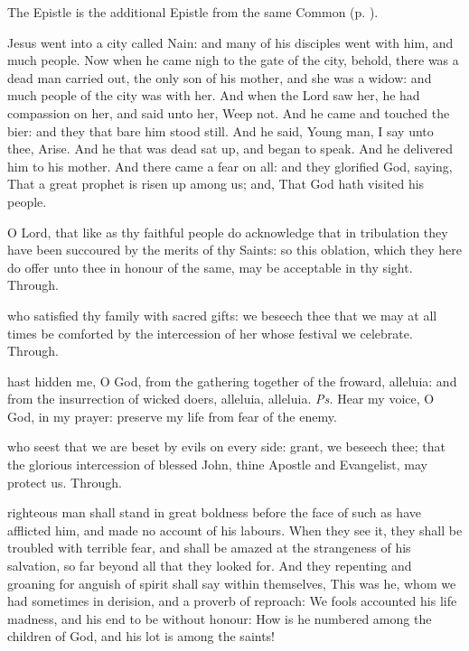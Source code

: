 \begin{rubric}
	The Epistle is the additional Epistle from the same Common (p. \pageref{1Timothy53}).
\end{rubric}

 Jesus went into a city called Nain: and many of his disciples went with him, and much people. Now when he came nigh to the gate of the city, behold, there was a dead man carried out, the only son of his mother, and she was a widow: and much people of the city was with her. And when the Lord saw her, he had compassion on her, and said unto her, Weep not. And he came and touched the bier: and they that bare him stood still. And he said, Young man, I say unto thee, Arise. And he that was dead sat up, and began to speak. And he delivered him to his mother. And there came a fear on all: and they glorified God, saying, That a great prophet is risen up among us; and, That God hath visited his people.

\secret
{} O Lord, that like as thy faithful people do acknowledge that in tribulation they have been succoured by the merits of thy Saints: so this oblation, which they here do offer unto thee in honour of the same, may be acceptable in thy sight. Through.

\postcommunion
{} who satisfied thy family with sacred gifts: we beseech thee that we may at all times be comforted by the intercession of her whose festival we celebrate. Through.


\clearpage
{}

\introit
{} hast hidden me, O God, from the gathering together of the froward, alleluia: and from the insurrection of wicked doers, alleluia, alleluia. \textit{Ps.} Hear my voice, O God, in my prayer: preserve my life from fear of the enemy.

\collect
{} who seest that we are beset by evils on every side: grant, we beseech thee; that the glorious intercession of blessed John, thine Apostle and Evangelist, may protect us. Through.

 righteous man shall stand in great boldness before the face of such as have afflicted him, and made no account of his labours. When they see it, they shall be troubled with terrible fear, and shall be amazed at the strangeness of his salvation, so far beyond all that they looked for. And they repenting and groaning for anguish of spirit shall say within themselves, This was he, whom we had sometimes in derision, and a proverb of reproach: We fools accounted his life madness, and his end to be without honour: How is he numbered among the children of God, and his lot is among the saints!

